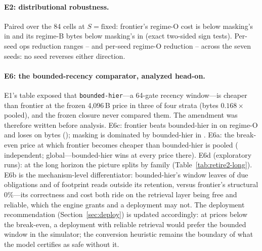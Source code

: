 \paragraph{E2: distributional robustness.} Paired over the 84 cells
at $S=\mathrm{fixed}$: frontier's regime-O cost is below masking's in
\ExpFrontierMaskingSignO{} and its regime-B bytes below masking's in
\ExpFrontierMaskingSignB{} (exact two-sided sign tests). Per-seed
ops reduction ranges \ExpSeedOpsMin{}--\ExpSeedOpsMax{} and per-seed
regime-O reduction \ExpSeedOMin{}--\ExpSeedOMax{} across the seven
seeds: no seed reverses either direction.

\paragraph{E6: the bounded-recency comparator, analyzed head-on.}
E1's table exposed that \texttt{bounded-hier}---a 64-gate recency
window---is cheaper than frontier at the frozen 4{,}096\,B price in
three of four strata (bytes $0.168\times$ pooled), and the frozen
closure never compared them. The amendment was therefore written
before analysis. E6c: frontier beats bounded-hier in
\ExpFrontierBhSignO{} on regime-O and loses on bytes
(\ExpFrontierBhSignB{}); masking is dominated by bounded-hier in
\ExpMaskingBhSignO. E6a: the break-even price at which frontier
becomes cheaper than bounded-hier is \ExpBhBreakEvenPooled{} pooled
(\ExpBhBreakEvenIndependent{} independent; \ExpBhBreakEvenGlobal{}
global---bounded-hier wins at every price there). E6d (exploratory
runs): at the long horizon the picture splits by family
(Table~\ref{tab:retire2-long}). E6b is the mechanism-level
differentiator: bounded-hier's window leaves \ExpBhDueExposed{} of
due obligations and \ExpBhFootprintExposed{} of footprint reads
outside its retention, versus frontier's structural 0\%---its
correctness and cost both ride on the retrieval layer being free and
reliable, which the engine grants and a deployment may not. The
deployment recommendation
(Section~\ref{sec:deploy}) is updated accordingly: at prices below
the break-even, a deployment with reliable retrieval would prefer
the bounded window in the simulator; the conversion heuristic remains
the boundary of what the model certifies as safe without it.

